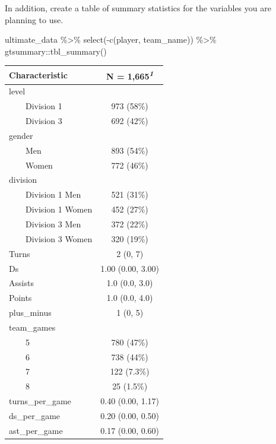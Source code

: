 \documentclass[
  letterpaper,
  DIV=11,
  numbers=noendperiod]{scrartcl}
\newenvironment{Shaded}{\begin{snugshade}}{\end{snugshade}}
\newcommand{\FunctionTok}[1]{\textcolor[rgb]{0.28,0.35,0.67}{#1}}
\newcommand{\NormalTok}[1]{\textcolor[rgb]{0.00,0.23,0.31}{#1}}
\newcommand{\SpecialCharTok}[1]{\textcolor[rgb]{0.37,0.37,0.37}{#1}}
\begin{document}
In addition, create a table of summary statistics for the variables you
are planning to use.

\begin{Shaded}
\begin{Highlighting}[]
\NormalTok{ultimate\_data }\SpecialCharTok{\%\textgreater{}\%} \FunctionTok{select}\NormalTok{(}\SpecialCharTok{{-}}\FunctionTok{c}\NormalTok{(player, team\_name)) }\SpecialCharTok{\%\textgreater{}\%}\NormalTok{ gtsummary}\SpecialCharTok{::}\FunctionTok{tbl\_summary}\NormalTok{()}
\end{Highlighting}
\end{Shaded}

\begin{table}
\fontsize{12.0pt}{14.4pt}\selectfont
\begin{tabular*}{\linewidth}{@{\extracolsep{\fill}}lc}
\toprule
\textbf{Characteristic} & \textbf{N = 1,665}\textsuperscript{\textit{1}} \\ 
\midrule\addlinespace[2.5pt]
level &  \\ 
    Division 1 & 973 (58\%) \\ 
    Division 3 & 692 (42\%) \\ 
gender &  \\ 
    Men & 893 (54\%) \\ 
    Women & 772 (46\%) \\ 
division &  \\ 
    Division 1 Men & 521 (31\%) \\ 
    Division 1 Women & 452 (27\%) \\ 
    Division 3 Men & 372 (22\%) \\ 
    Division 3 Women & 320 (19\%) \\ 
Turns & 2 (0, 7) \\ 
Ds & 1.00 (0.00, 3.00) \\ 
Assists & 1.0 (0.0, 3.0) \\ 
Points & 1.0 (0.0, 4.0) \\ 
plus\_minus & 1 (0, 5) \\ 
team\_games &  \\ 
    5 & 780 (47\%) \\ 
    6 & 738 (44\%) \\ 
    7 & 122 (7.3\%) \\ 
    8 & 25 (1.5\%) \\ 
turns\_per\_game & 0.40 (0.00, 1.17) \\ 
ds\_per\_game & 0.20 (0.00, 0.50) \\ 
ast\_per\_game & 0.17 (0.00, 0.60) \\ 

\end{tabular*}
\end{table}
\end{document}
